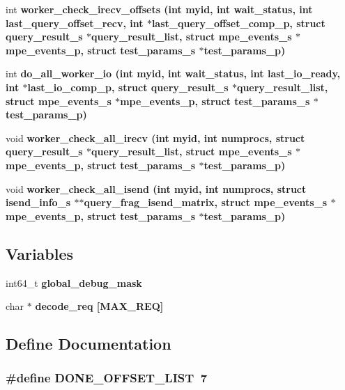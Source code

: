 \begin{CompactItemize}
\item 
int \bf{worker\_\-check\_\-irecv\_\-offsets} (int myid, int wait\_\-status, int last\_\-query\_\-offset\_\-recv, int $\ast$last\_\-query\_\-offset\_\-comp\_\-p, struct \bf{query\_\-result\_\-s} $\ast$query\_\-result\_\-list, struct \bf{mpe\_\-events\_\-s} $\ast$mpe\_\-events\_\-p, struct \bf{test\_\-params\_\-s} $\ast$test\_\-params\_\-p)
\item 
int \bf{do\_\-all\_\-worker\_\-io} (int myid, int wait\_\-status, int last\_\-io\_\-ready, int $\ast$last\_\-io\_\-comp\_\-p, struct \bf{query\_\-result\_\-s} $\ast$query\_\-result\_\-list, struct \bf{mpe\_\-events\_\-s} $\ast$mpe\_\-events\_\-p, struct \bf{test\_\-params\_\-s} $\ast$test\_\-params\_\-p)
\item 
void \bf{worker\_\-check\_\-all\_\-irecv} (int myid, int numprocs, struct \bf{query\_\-result\_\-s} $\ast$query\_\-result\_\-list, struct \bf{mpe\_\-events\_\-s} $\ast$mpe\_\-events\_\-p, struct \bf{test\_\-params\_\-s} $\ast$test\_\-params\_\-p)
\item 
void \bf{worker\_\-check\_\-all\_\-isend} (int myid, int numprocs, struct \bf{isend\_\-info\_\-s} $\ast$$\ast$query\_\-frag\_\-isend\_\-matrix, struct \bf{mpe\_\-events\_\-s} $\ast$mpe\_\-events\_\-p, struct \bf{test\_\-params\_\-s} $\ast$test\_\-params\_\-p)
\end{CompactItemize}
\subsection*{Variables}
\begin{CompactItemize}
\item 
int64\_\-t \bf{global\_\-debug\_\-mask}
\item 
char $\ast$ \bf{decode\_\-req} [MAX\_\-REQ]
\end{CompactItemize}


\subsection{Define Documentation}
\subsubsection{\setlength{\rightskip}{0pt plus 5cm}\#define DONE\_\-OFFSET\_\-LIST~7}\label{worker__help_8h_c8d66fc22b3a1de83900489ec30ebee9}



